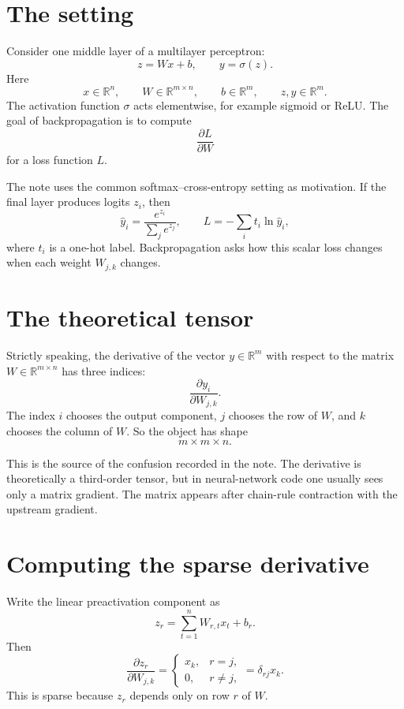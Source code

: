 
\section{The setting}

Consider one middle layer of a multilayer perceptron:
\[
  z=Wx+b,\qquad y=\sigma(z).
\]
Here
\[
  x\in\mathbb R^n,\qquad
  W\in\mathbb R^{m\times n},\qquad
  b\in\mathbb R^m,\qquad
  z,y\in\mathbb R^m.
\]
The activation function $\sigma$ acts elementwise, for example sigmoid or ReLU.  The goal of backpropagation is to compute
\[
  \frac{\partial L}{\partial W}
\]
for a loss function $L$.

The note uses the common softmax--cross-entropy setting as motivation.  If the final layer produces logits $z_i$, then
\[
  \hat y_i=\frac{e^{z_i}}{\sum_j e^{z_j}},\qquad
  L=-\sum_i t_i\ln \hat y_i,
\]
where $t_i$ is a one-hot label.  Backpropagation asks how this scalar loss changes when each weight $W_{j,k}$ changes.

\section{The theoretical tensor}

Strictly speaking, the derivative of the vector $y\in\mathbb R^m$ with respect to the matrix $W\in\mathbb R^{m\times n}$ has three indices:
\[
  \frac{\partial y_i}{\partial W_{j,k}}.
\]
The index $i$ chooses the output component, $j$ chooses the row of $W$, and $k$ chooses the column of $W$.  So the object has shape
\[
  m\times m\times n.
\]

This is the source of the confusion recorded in the note.  The derivative is theoretically a third-order tensor, but in neural-network code one usually sees only a matrix gradient.  The matrix appears after chain-rule contraction with the upstream gradient.

\section{Computing the sparse derivative}

Write the linear preactivation component as
\[
  z_r=\sum_{t=1}^n W_{r,t}x_t+b_r.
\]
Then
\[
  \frac{\partial z_r}{\partial W_{j,k}}
  =
  \begin{cases}
  x_k,&r=j,\\
  0,&r\ne j,
  \end{cases}
  =\delta_{rj}x_k.
\]
This is sparse because $z_r$ depends only on row $r$ of $W$.

